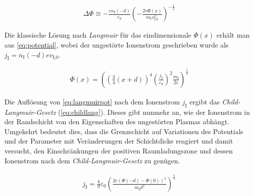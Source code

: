 \documentclass[numbers=noenddot,a4paper,notitlepage,twoside,BCOR15mm]{scrbook}
\newcommand{\ix}[1]{_\text{#1}}
\newcommand{\tilt}[1]{\textit{#1}}
\begin{document}
			\begin{align}
				\Delta\Phi\cong-\frac{en\ix{I}\left(-d\right)}{\varepsilon\ix{0}}\left(-\frac{2e\Phi\left(x\right)}{m\ix{I}v\ix{I,0}^2}\right)^{-\frac{1}{2}} \label{eq:potential}
			\end{align}

		Die klassische Lösung nach \tilt{Langmuir} für das eindimensionale $\Phi\left(x\right)$ erhält man aus \autoref{eq:potential}, wobei der ungestörte Ionenstrom geschrieben wurde als $j\ix{I}=n\ix{I}\left(-d\right)ev\ix{I,0}$.

			\begin{align}
				\Phi\left(x\right)=\left(\left(\frac{3}{4}\left(x+d\right)\right)^4\left(\frac{j\ix{I}}{\varepsilon\ix{0}}\right)^2\frac{m\ix{I}}{2e}\right)^{\frac{1}{3}}  \label{eq:langmuirpot}
			\end{align}

		Die Auflösung von \autoref{eq:langmuirpot} nach dem Ionenstrom $j\ix{I}$ ergibt das \tilt{Child-Langmuir-Gesetz} (\autoref{eq:childlang}). Dieses gibt nunmehr an, wie der Ionenstrom in der Randschicht von den Eigenschaften des ungestörten Plasmas abhängt. Umgekehrt bedeutet dies, dass die Grenzschicht auf Variationen des Potentials und der Parameter mit Veränderungen der Schichtdicke reagiert und damit versucht, den Einschränkungen der positiven Raumladungszone und dessen Ionenstrom nach dem \tilt{Child-Langmuir-Gesetz} zu genügen.

			\begin{align}
				j\ix{I}=\frac{4}{9}\varepsilon\ix{0}\left(\frac{2e\left(\Phi\left(-d\right)-\Phi\left(0\right)\right)^3}{m\ix{I}d^2}\right)^{\frac{1}{2}} \label{eq:childlang}
			\end{align}
\end{document}
